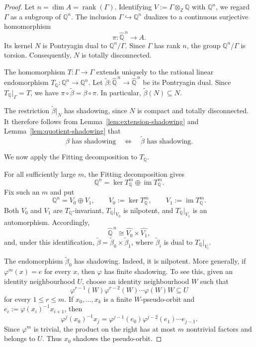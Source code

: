 \documentclass[12pt]{amsart}
\theoremstyle{definition}
\numberwithin{equation}{section}
\theoremstyle{remark}
\begin{document}
\begin{proof}
Let $n=\dim A=\operatorname{rank}(\Gamma)$. Identifying
$V:=\Gamma\otimes_{\mathbb Z}\mathbb Q$ with $\mathbb Q^n$, we regard
$\Gamma$ as a subgroup of $\mathbb Q^n$. The inclusion
$\Gamma\hookrightarrow\mathbb Q^n$ dualizes to a continuous
surjective homomorphism
\[
\pi:\widehat{\mathbb Q}^{\,n}\longrightarrow A.
\]
Its kernel $N$ is Pontryagin dual to $\mathbb Q^n/\Gamma$. Since
$\Gamma$ has rank $n$, the group $\mathbb Q^n/\Gamma$ is torsion.
Consequently, $N$ is totally disconnected.

The homomorphism $T:\Gamma\to\Gamma$ extends uniquely to the rational
linear endomorphism $T_{\mathbb Q}:\mathbb Q^n\to\mathbb Q^n$. Let
$\widetilde\beta:\widehat{\mathbb Q}^{\,n}\to
\widehat{\mathbb Q}^{\,n}$ be its Pontryagin dual. Since
$T_{\mathbb Q}|_\Gamma=T$, we have
$\pi\circ\widetilde\beta=\beta\circ\pi$. In particular,
$\widetilde\beta(N)\subseteq N$.

The restriction $\widetilde\beta|_N$ has shadowing, since $N$ is
compact and totally disconnected. It therefore follows from
Lemma~\ref{lem:extension-shadowing} and
Lemma~\ref{lem:quotient-shadowing} that
\[
\beta\text{ has shadowing}
\quad\Longleftrightarrow\quad
\widetilde\beta\text{ has shadowing}.
\]

We now apply the Fitting decomposition to $T_{\mathbb Q}$.

For all sufficiently large $m$, the Fitting decomposition gives
\[
\mathbb Q^n
=
\ker T_{\mathbb Q}^m
\oplus
\operatorname{im}T_{\mathbb Q}^m.
\]
Fix such an $m$ and put 
\[
\mathbb Q^n
=
V_0\oplus V_1,
\qquad
V_0:=\ker T_{\mathbb Q}^m,
\qquad
V_1:=\operatorname{im}T_{\mathbb Q}^m.
\]
Both $V_0$ and $V_1$ are $T_{\mathbb Q}$-invariant,
$T_{\mathbb Q}|_{V_0}$ is nilpotent, and
$T_{\mathbb Q}|_{V_1}$ is an automorphism. Accordingly,
\[
\widehat{\mathbb Q}^{\,n}
\cong
\widehat{V_0}\times\widehat{V_1},
\]
and, under this identification,
$\widetilde\beta=\widetilde\beta_0\times\widetilde\beta_1$, where
$\widetilde\beta_i$ is dual to $T_{\mathbb Q}|_{V_i}$.

The endomorphism $\widetilde\beta_0$ has shadowing. Indeed, it is
nilpotent. More generally, if $\varphi^m(x)=e$ for every $x$, then $\varphi$ has finite shadowing. To see this,
given an identity neighbourhood $U$, choose an identity neighbourhood
$W$ such that
\[
\varphi^{r-1}(W)\varphi^{r-2}(W)\cdots\varphi(W)W
\subseteq U
\]
for every $1\leq r\leq m$. If $x_0,\ldots,x_k$ is a finite
$W$-pseudo-orbit and
$e_i:=\varphi(x_i)^{-1}x_{i+1}$, then
\[
\varphi^j(x_0)^{-1}x_j
=
\varphi^{j-1}(e_0)\varphi^{j-2}(e_1)\cdots e_{j-1}.
\]
Since $\varphi^m$ is trivial, the product on the right has at most
$m$ nontrivial factors and belongs to $U$. Thus $x_0$ shadows the
pseudo-orbit.


\end{proof}
\end{document}
